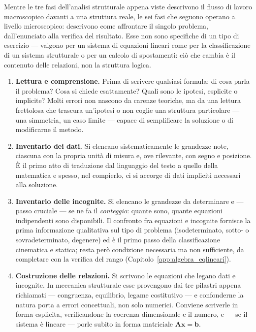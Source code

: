 Mentre le tre fasi dell'analisi strutturale appena viste descrivono il flusso
di lavoro macroscopico davanti a una struttura reale, le sei fasi che seguono
operano a livello microscopico: descrivono come affrontare il singolo
problema, dall'enunciato alla verifica del risultato. Esse non sono specifiche
di un tipo di esercizio --- valgono per un sistema di equazioni lineari come
per la classificazione di un sistema strutturale o per un calcolo di
spostamenti: ciò che cambia è il contenuto delle relazioni, non la struttura
logica.

\begin{enumerate}[label=\textbf{\arabic*.}, leftmargin=*]
	\item \textbf{Lettura e comprensione.} Prima di scrivere qualsiasi formula:
	di cosa parla il problema? Cosa si chiede esattamente? Quali sono le
	ipotesi, esplicite o implicite? Molti errori non nascono da carenze
	teoriche, ma da una lettura frettolosa che trascura un'ipotesi o non coglie
	una struttura particolare --- una simmetria, un caso limite --- capace di
	semplificare la soluzione o di modificarne il metodo.
	
	\item \textbf{Inventario dei dati.} Si elencano sistematicamente le
	grandezze note, ciascuna con la propria unità di misura e, ove rilevante,
	con segno e posizione. È il primo atto di traduzione dal linguaggio del
	testo a quello della matematica e spesso, nel compierlo, ci si accorge di
	dati impliciti necessari alla soluzione.
	
	\item \textbf{Inventario delle incognite.} Si elencano le grandezze da
	determinare e --- passo cruciale --- se ne fa il \emph{conteggio}: quante
	sono, quante equazioni indipendenti sono disponibili. Il confronto fra
	equazioni e incognite fornisce la prima informazione qualitativa sul tipo di
	problema (isodeterminato, sotto- o sovradeterminato, degenere) ed è il primo
	passo della classificazione cinematica e statica; resta però condizione
	necessaria ma non sufficiente, da completare con la verifica del rango
	(Capitolo~\ref{app:algebra_eqlineari}).
	
	\item \textbf{Costruzione delle relazioni.} Si scrivono le equazioni che
	legano dati e incognite. In meccanica strutturale esse provengono dai tre
	pilastri appena richiamati --- congruenza, equilibrio, legame costitutivo
	--- e confonderne la natura porta a errori concettuali, non solo numerici.
	Conviene scriverle in forma esplicita, verificandone la coerenza
	dimensionale e il numero, e --- se il sistema è lineare --- porle subito in
	forma matriciale $\bm{A}\bm{x} = \bm{b}$.
	

\end{enumerate}
